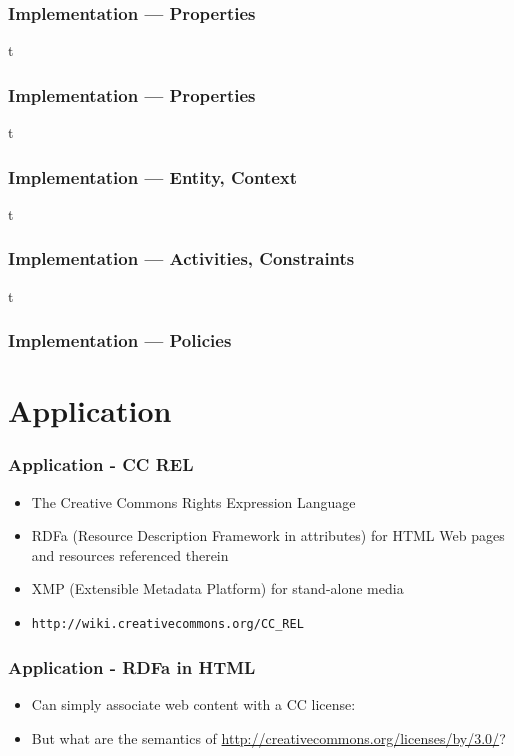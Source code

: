 \documentclass[t, xcolor=dvipsnames, 10pt]{beamer}
\begin{document}
\begin{frame}[t]
\frametitle{Implementation --- Properties}

\end{frame}

\begin{frame}{t}
\frametitle{Implementation --- Properties}

\end{frame}

\begin{frame}{t}
\frametitle{Implementation --- Entity, Context}

\pause

\end{frame}

\begin{frame}{t}
\frametitle{Implementation --- Activities, Constraints}

\pause

\end{frame}


\begin{frame}{t}
\frametitle{Implementation --- Policies}

\pause

\end{frame}


\section{Application}
\begin{frame}[t]
    \frametitle{Application - CC REL}
    \begin{itemize}
        \item The Creative Commons Rights Expression Language
        \item RDFa (Resource Description Framework in attributes) for HTML
        Web pages and resources referenced therein
        \item XMP (Extensible Metadata Platform) for stand-alone media
        \item \texttt{http://wiki.creativecommons.org/CC\_REL}
    \end{itemize}
\end{frame}

\begin{frame}[fragile]
\frametitle{Application - RDFa in HTML}
        \begin{itemize}
            \item Can simply associate web content with a CC license:
        \end{itemize}

        \begin{itemize}
            \item But what are the semantics of \url{http://creativecommons.org/licenses/by/3.0/}?
        \end{itemize}
\end{frame}
\end{document}
